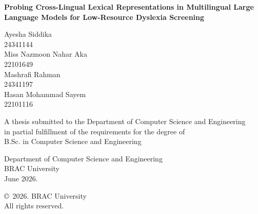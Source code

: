 \begin{titlepage}
\renewcommand*{\thepage}{Title}

    \begin{center}
        \vspace*{2cm}

        {\fontsize{18pt}{24pt}\selectfont\textbf{Probing Cross-Lingual Lexical Representations in Multilingual Large Language Models for Low-Resource Dyslexia Screening}}

        \vspace{1.5cm}


        \vspace{0.5cm}

            Ayesha Siddika\\
            24341144\\
            Miss Nazmoon Nahar Aka\\
            22101649\\
            Mashrafi Rahman\\
            24341197\\
            Hasan Mohammad Sayem\\
            22101116

        \vspace{1.5cm}

            A thesis submitted to the Department of Computer Science and Engineering\\
            in partial fulfillment of the requirements for the degree of\\
            B.Sc. in Computer Science and Engineering

        \vspace{2.5cm}

            Department of Computer Science and Engineering\\
            BRAC University\\
            June 2026.

        \vspace{3cm}

            \copyright\ 2026. BRAC University\\
            All rights reserved.

    \end{center}

\end{titlepage}